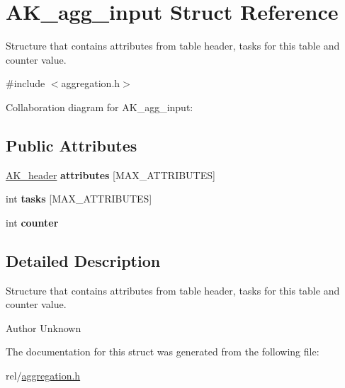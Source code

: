 \hypertarget{structAK__agg__input}{\section{A\+K\+\_\+agg\+\_\+input Struct Reference}
\label{structAK__agg__input}
}


Structure that contains attributes from table header, tasks for this table and counter value.  




{\ttfamily \#include $<$aggregation.\+h$>$}



Collaboration diagram for A\+K\+\_\+agg\+\_\+input\+:
\subsection*{Public Attributes}
\begin{DoxyCompactItemize}
\item 
\hypertarget{structAK__agg__input_a932027458b8c435e69f36ba37fc9de0c}{\hyperlink{structAK__header}{A\+K\+\_\+header} {\bfseries attributes} \mbox{[}M\+A\+X\+\_\+\+A\+T\+T\+R\+I\+B\+U\+T\+E\+S\mbox{]}}\label{structAK__agg__input_a932027458b8c435e69f36ba37fc9de0c}

\item 
\hypertarget{structAK__agg__input_af82e95204d38317274d58ef54c11f19b}{int {\bfseries tasks} \mbox{[}M\+A\+X\+\_\+\+A\+T\+T\+R\+I\+B\+U\+T\+E\+S\mbox{]}}\label{structAK__agg__input_af82e95204d38317274d58ef54c11f19b}

\item 
\hypertarget{structAK__agg__input_a008ffea3c7974da90b1176c63874ad5b}{int {\bfseries counter}}\label{structAK__agg__input_a008ffea3c7974da90b1176c63874ad5b}

\end{DoxyCompactItemize}


\subsection{Detailed Description}
Structure that contains attributes from table header, tasks for this table and counter value. 

\begin{DoxyAuthor}{Author}
Unknown 
\end{DoxyAuthor}


The documentation for this struct was generated from the following file\+:\begin{DoxyCompactItemize}
\item 
rel/\hyperlink{aggregation_8h}{aggregation.\+h}\end{DoxyCompactItemize}
